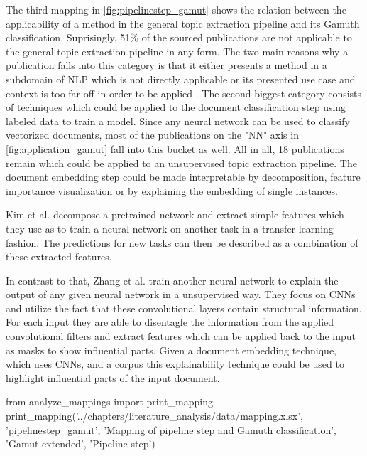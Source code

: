 The third mapping in \autoref{fig:pipelinestep_gamut} shows the relation between the applicability of a method in the general topic extraction pipeline and its Gamuth classification. Suprisingly, 51\% of the sourced publications are not applicable to the general topic extraction pipeline in any form. The two main reasons why a publication falls into this category is that it either presents a method in a subdomain of NLP which is not directly applicable \cite{goyalTransparentAISystems2016} \cite{itoTextVisualizingNeuralNetwork2018a} or its presented use case and context is too far off in order to be applied \cite{8591457} \cite{gengHumancentricTransferLearning}. 
The second biggest category consists of techniques which could be applied to the document classification step using labeled data to train a model. Since any neural network can be used to classify vectorized documents, most of the publications on the "NN" axis in \autoref{fig:application_gamut} fall into this bucket as well. All in all, 18 publications remain which could be applied to an unsupervised topic extraction pipeline. 
The document embedding step could be made interpretable by decomposition, feature importance visualization or by explaining the embedding of single instances. 

Kim et al. \cite{kimStructureDeepNeural2019} decompose a pretrained network and extract simple features which they use as to train a neural network on another task in a transfer learning fashion. The predictions for new tasks can then be described as a combination of these extracted features.

In contrast to that, Zhang et al. \cite{zhangUnsupervisedLearningNeural2018} train another neural network to explain the output of any given neural network in a unsupervised way. They focus on CNNs and utilize the fact that these convolutional layers contain structural information. For each input they are able to disentagle the information from the applied convolutional filters and extract features which can be applied back to the input as masks to show influential parts. Given a document embedding technique, which uses CNNs, and a corpus this explainability technique could be used to highlight influential parts of the input document.

\begin{pycode}
from analyze_mappings import print_mapping
print_mapping('../chapters/literature_analysis/data/mapping.xlsx', 'pipelinestep_gamut', 'Mapping of pipeline step and Gamuth classification', 'Gamut extended', 'Pipeline step')
\end{pycode}


